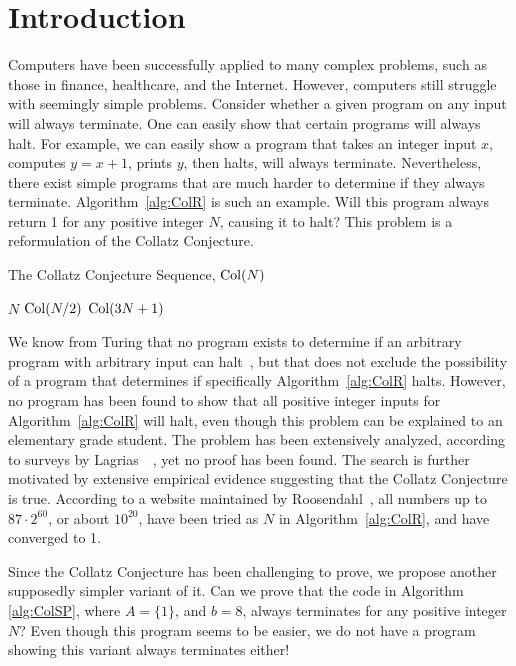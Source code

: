 \chapter{Introduction} \label{sec:introduction}
Computers have been successfully applied to many complex problems, such as those in finance, healthcare, and the Internet. However, computers still struggle with seemingly simple problems. Consider whether a given program on any input will always terminate. One can easily show that certain programs will always halt. For example, we can easily show a program that takes an integer input $x$, computes $y=x+1$, prints $y$, then halts, will always terminate. Nevertheless, there exist simple programs that are much harder to determine if they always terminate. Algorithm~\ref{alg:ColR} is such an example. Will this program always return 1 for any positive integer $N$, causing it to halt? This problem is a reformulation of the Collatz Conjecture. \par
\begin{algorithm} 
\caption{The Collatz Conjecture Sequence, $\mathrm{Col}(N)$}
\label{alg:ColR} 
\begin{algorithmic}[1]
     \Return $N$ 
    \EndIf
     \Return $\mathrm{Col}(N/2)$
    \EndIf
    \State \Return $\mathrm{Col}(3N + 1)$ 
\end{algorithmic}
\end{algorithm}
We know from Turing that no program exists to determine if an arbitrary program with arbitrary input can halt~\cite{Turing1936}, but that does not exclude the possibility of a program that determines if specifically Algorithm~\ref{alg:ColR} halts. However, no program has been found to show that all positive integer inputs for Algorithm~\ref{alg:ColR} will halt, even though this problem can be explained to an elementary grade student. The problem has been extensively analyzed, according to surveys by Lagrias~\cite{2003mathLagrais}~\cite{2006mathLagrias}, yet no proof has been found. The search is further motivated by extensive empirical evidence suggesting that the Collatz Conjecture is true. According to a website maintained by Roosendahl~\cite{EricRoose}, all numbers up to $87 \cdot 2^{60}$, or about $10^{20}$, have been tried as $N$ in Algorithm~\ref{alg:ColR}, and have converged to 1. \par
Since the Collatz Conjecture has been challenging to prove, we propose another supposedly simpler variant of it. Can we prove that the code in Algorithm \ref{alg:ColSP}, where $A = \{1\}$, and $b = 8$, always terminates for any positive integer $N$? Even though this program seems to be easier, we do not have a program showing this variant always terminates either! \par
